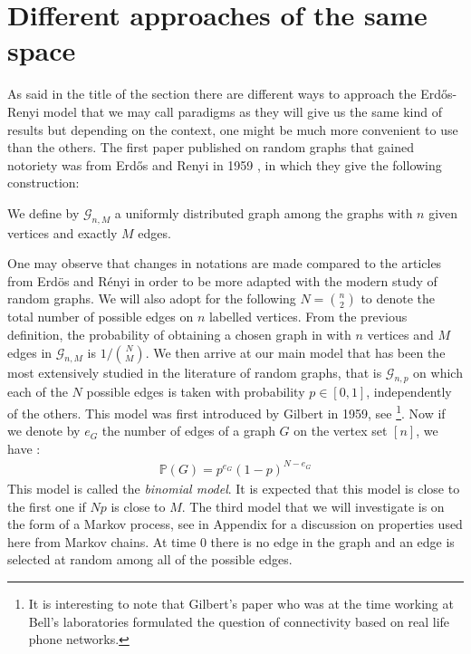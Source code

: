 \section{Different approaches of the same space}
As said in the title of the section there are different ways to approach the Erd\H{o}s-Renyi model that we may call paradigms as they will give us the same kind of results but depending on the context, one might be much more convenient to use than the others.
\newline
The first paper published on random graphs that gained notoriety was from Erd\H{o}s and Renyi in 1959 \cite{erdos59}, in which they give the following construction:
\begin{definition}
We define by $\mathcal{G}_{n, M}$ a uniformly distributed graph among the graphs with $n$ given vertices and exactly $M$ edges.
\end{definition}
One may observe that changes in notations are made compared to the articles from Erd\"os and R\'enyi in order to be more adapted with the modern study of random graphs.
We will also adopt for the following $N = \binom{n}{2}$ to denote the total number of possible edges on $n$ labelled vertices.
From the previous definition, the probability of obtaining a chosen graph in with $n$ vertices and $M$ edges in $\mathcal{G}_{n, M}$ is $1/\binom{N}{M}$.
\newline
We then arrive at our main model that has been the most extensively studied in the literature of random graphs, that is $\mathcal{G}_{n, p}$ on which each of the $N$ possible edges is taken with probability $p \in [0, 1]$, independently of the others.
This model was first introduced by Gilbert in 1959, see \cite{Gilbert59}\footnote{It is interesting to note that Gilbert's paper who was at the time working at Bell's laboratories formulated the question of connectivity based on real life phone networks.}.
Now if we denote by $e_G$ the number of edges of a graph $G$ on the vertex set $[n]$, we have :
\begin{align}
	\mathbb{P}(G) = p^{e_G}(1-p)^{N-e_G}
\end{align}
This model is called the \emph{binomial model}. It is expected that this model is close to the first one if $Np$ is close to $M$.
\newline
The third model that we will investigate is on the form of a Markov process, see in Appendix for a discussion on properties used here from Markov chains. 
At time 0 there is no edge in the graph and an edge is selected at random among all of the possible edges. 
